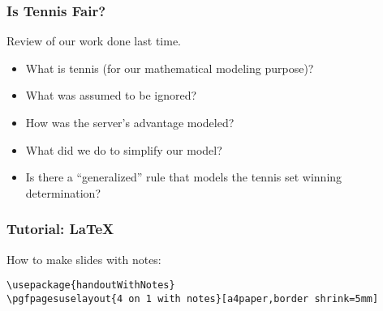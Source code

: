 \documentclass[hyperref={colorlinks=false},compress,handout,10pt]{beamer}
\let\olditem\item
\renewcommand{\item}{\setlength{\itemsep}{0.5\baselineskip}\olditem}
\def\LaTeXs{\LaTeX\ }
\begin{document}
\begin{frame}
    \frametitle{Is Tennis Fair?}
    Review of our work done last time. 
    \begin{itemize}
        \item What is tennis (for our mathematical modeling purpose)? 
        \item What was assumed to be ignored? 
        \item How was the server's advantage modeled? 
        \item What did we do to simplify our model? 
        \item Is there a ``generalized'' rule that models the tennis set
            winning determination? 
    \end{itemize}
\end{frame}

\begin{frame}[fragile]
    \frametitle{Tutorial: \LaTeXs}
    How to make slides with notes:
    \begin{lstlisting}
\usepackage{handoutWithNotes}
\pgfpagesuselayout{4 on 1 with notes}[a4paper,border shrink=5mm]
    \end{lstlisting}
\end{frame}

%
%
%
%
\end{document}
